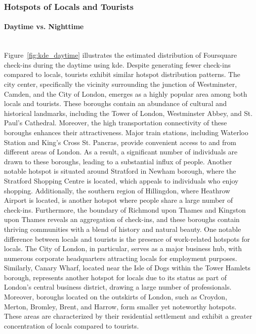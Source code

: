 \documentclass{article}
\newcommand{\subsubsubsection}[1]{\paragraph{#1}\mbox{}\\}
\theoremstyle{definition}
\theoremstyle{remark}
\begin{document}
\subsubsection{Hotspots of Locals and Tourists} \label{hotspots}

\subsubsubsection{Daytime vs. Nighttime}
Figure~\ref{fig:kde_daytime} illustrates the estimated distribution of Foursquare check-ins during the daytime using \acrshort{kde}. Despite generating fewer check-ins compared to locals, tourists exhibit similar hotspot distribution patterns. The city center, specifically the vicinity surrounding the junction of Westminster, Camden, and the City of London, emerges as a highly popular area among both locals and tourists. These boroughs contain an abundance of cultural and historical landmarks, including the Tower of London, Westminster Abbey, and St. Paul's Cathedral. Moreover, the high transportation connectivity of these boroughs enhances their attractiveness. Major train stations, including Waterloo Station and King's Cross St. Pancras, provide convenient access to and from different areas of London. As a result, a significant number of individuals are drawn to these boroughs, leading to a substantial influx of people. Another notable hotspot is situated around Stratford in Newham borough, where the Stratford Shopping Centre is located, which appeals to individuals who enjoy shopping. Additionally, the southern region of Hillingdon, where Heathrow Airport is located, is another hotspot where people share a large number of check-ins. Furthermore, the boundary of Richmond upon Thames and Kingston upon Thames reveals an aggregation of check-ins, and these boroughs contain thriving communities with a blend of history and natural beauty. One notable difference between locals and tourists is the presence of work-related hotspots for locals. The City of London, in particular, serves as a major business hub, with numerous corporate headquarters attracting locals for employment purposes. Similarly, Canary Wharf, located near the Isle of Dogs within the Tower Hamlets borough, represents another hotspot for locals due to its status as part of London's central business district, drawing a large number of professionals. Moreover, boroughs located on the outskirts of London, such as Croydon, Merton, Bromley, Brent, and Harrow, form smaller yet noteworthy hotspots. These areas are characterized by their residential settlement and exhibit a greater concentration of locals compared to tourists.
\end{document}
